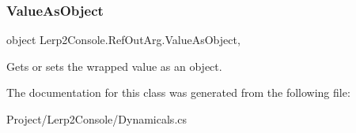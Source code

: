 \subsubsection{\texorpdfstring{Value\+As\+Object}{ValueAsObject}}
{\footnotesize\ttfamily object Lerp2\+Console.\+Ref\+Out\+Arg.\+Value\+As\+Object\hspace{0.3cm}{\ttfamily [get]}, {\ttfamily [set]}}



Gets or sets the wrapped value as an object. 



The documentation for this class was generated from the following file\+:\begin{DoxyCompactItemize}
\item 
Project/\+Lerp2\+Console/Dynamicals.\+cs\end{DoxyCompactItemize}

